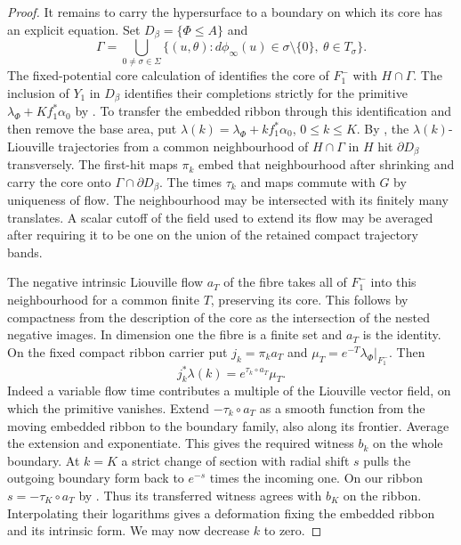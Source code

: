 \begin{proof}
It remains to carry the hypersurface to a boundary on which its core has an explicit equation. Set $D_\beta=\{\Phi\le A\}$ and
\[
 \Gamma=\bigcup_{0\ne\sigma\in\Sigma}
 \{(u,\theta):d\phi_\infty(u)\in\sigma\setminus\{0\},\
                                              \theta\in T_\sigma\}.
\]
The fixed-potential core calculation of \cite[\S T.16, T.115--T.116]{FHSZ} identifies the core of $F_1^-$ with $H\cap\Gamma$. The inclusion of $Y_1$ in $D_\beta$ identifies their completions strictly for the primitive $\lambda_\Phi+Kf_1^*\alpha_0$ by \cite[Q.59]{FHSZ}. To transfer the embedded ribbon through this identification and then remove the base area, put $\lambda(k)=\lambda_\Phi+kf_1^*\alpha_0$, $0\le k\le K$. By \cite[U.31, U.34--U.41, U.46--U.54]{FHSZ}, the $\lambda(k)$-Liouville trajectories from a common neighbourhood of $H\cap\Gamma$ in $H$ hit $\partial D_\beta$ transversely. The first-hit maps $\pi_k$ embed that neighbourhood after shrinking and carry the core onto $\Gamma\cap\partial D_\beta$. The times $\tau_k$ and maps commute with $G$ by uniqueness of flow. The neighbourhood may be intersected with its finitely many translates. A scalar cutoff of the field used to extend its flow may be averaged after requiring it to be one on the union of the retained compact trajectory bands.

The negative intrinsic Liouville flow $a_T$ of the fibre takes all of $F_1^-$ into this neighbourhood for a common finite $T$, preserving its core. This follows by compactness from the description of the core as the intersection of the nested negative images. In dimension one the fibre is a finite set and $a_T$ is the identity. On the fixed compact ribbon carrier put $j_k=\pi_k a_T$ and $\mu_T=e^{-T}\lambda_\Phi|_{F_1^-}$. Then
\[
                     j_k^*\lambda(k)=e^{\tau_k\circ a_T}\mu_T .
\]
Indeed a variable flow time contributes a multiple of the Liouville vector field, on which the primitive vanishes. Extend $-\tau_k\circ a_T$ as a smooth function from the moving embedded ribbon to the boundary family, also along its frontier. Average the extension and exponentiate. This gives the required witness $b_k$ on the whole boundary. At $k=K$ a strict change of section with radial shift $s$ pulls the outgoing boundary form back to $e^{-s}$ times the incoming one. On our ribbon $s=-\tau_K\circ a_T$ by \cite[U.55--U.57, V.1--V.13]{FHSZ}. Thus its transferred witness agrees with $b_K$ on the ribbon. Interpolating their logarithms gives a deformation fixing the embedded ribbon and its intrinsic form. We may now decrease $k$ to zero.


\end{proof}
